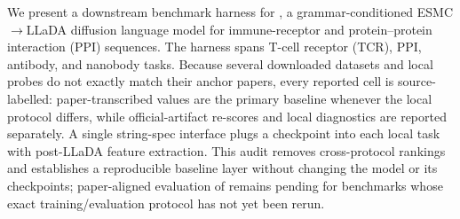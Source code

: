 We present a downstream benchmark harness for \Ours{}, a grammar-conditioned
ESMC$\rightarrow$LLaDA diffusion language model for immune-receptor and
protein--protein interaction (PPI) sequences. The harness spans T-cell receptor
(TCR), PPI, antibody, and nanobody tasks. Because several downloaded datasets
and local probes do not exactly match their anchor papers, every reported cell
is source-labelled: paper-transcribed values are the primary baseline whenever
the local protocol differs, while official-artifact re-scores and local
diagnostics are reported separately. A single string-spec interface plugs a
checkpoint into each local task with post-LLaDA feature extraction. This audit
removes cross-protocol rankings and establishes a reproducible baseline layer
without changing the model or its checkpoints; paper-aligned evaluation of
\Ours{} remains pending for benchmarks whose exact training/evaluation protocol
has not yet been rerun.
